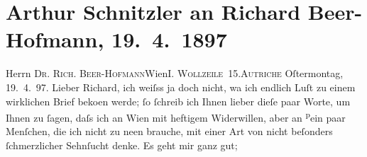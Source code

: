 

         
         \renewcommand{\erwaehntePersonen}{Personen: Richard Beer-Hofmann, Paula Beer-Hofmann, Paul Goldmann, Hugo von Hofmannsthal, Felix Salten, Gustav Schwarzkopf, Leo Van-Jung}
         \renewcommand{\erwaehnteOrte}{Orte: Frankfurt am Main, I., Innere Stadt, Paris, Wien, Wollzeile, rue La Fayette, rue de la Bourse, Österreich}
         \renewcommand{\erwaehnteWerke}{}
               \section[Arthur Schnitzler an Richard Beer-Hofmann, 19. 4. 1897]{ Arthur Schnitzler an Richard Beer-Hofmann, 19. 4. 1897}\nopagebreak{}\rehead{ }\begin{ledgroupsized}[t]{13cm}\normalsize\beginnumbering \toendnotes[C]{\smallbreak\pagebreak[2]} 
\toendnotes[C]{\smallbreak}\pstart{}{\pb}Herrn \textsc{Dr. Rich.
                     Beer-Hofmann}\pend{}\pstart{}Wien\pend{}\pstart{}\textsc{I. Wollzeile 15}.\pend{}\pstart{}\textsc{Autriche}\pend{}{\bigskip}\pstart
           \raggedleft{}{\pb}Oſtermontag, 19. 4. 97.\pend
           \pstart
           Lieber Richard, ich weiſss ja doch nicht, wa{\geminationn} ich endlich Luſt zu einem wirklichen Brief beko{\geminationm}en werde; ſo ſchreib ich Ihnen lieber dieſe paar Worte,
               um Ihnen zu ſagen, daſs ich an Wien mit heftigem
               Widerwillen, aber an \substVorne{}\textsuperscript{p}\substDazwischen{}e\substHinten{}in paar Menſchen, die ich nicht zu ne{\geminationn}en
               brauche, mit einer Art \introOben{}von\introOben{} nicht beſonders {\pb}ſchmerzlicher Sehnſucht denke. Es geht mir ganz gut;

\end{ledgroupsized}
